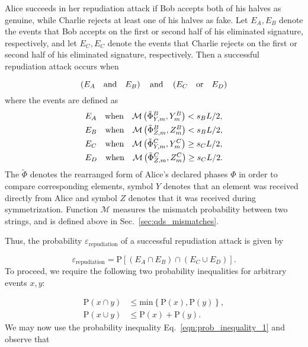 
Alice succeeds in her repudiation attack if Bob accepts both of his halves as genuine, while Charlie rejects at least one of his halves as fake. Let $E_A, E_B$ denote the events that Bob accepts on the first or second half of his eliminated signature, respectively, and let $E_C, E_C$ denote the events that Charlie rejects on the first or second half of his eliminated signature, respectively. Then a successful repudiation attack occurs when

\begin{equation}
\left(E_A \qq{and} E_B \right) \qq{and} \left( E_C \qq{or} E_D\right) \notag
\end{equation}
where the events are defined as
\begin{align}\label{eqn:repudiation_events}
&E_A \qq{when} \mathcal{M}\left(\tilde{\Phi}_{Y, m}^B, Y_m^B\right) < s_B L/2,  \notag \\
%
&E_B \qq{when} \mathcal{M}\left(\tilde{\Phi}_{Z, m}^B, Z_m ^B\right) < s_B L/2, \notag \\
%
&E_C \qq{when} \mathcal{M}\left(\tilde{\Phi}_{Y, m}^C, Y_m^C\right) \ge s_C L/2, \notag \\
%
&E_D \qq{when} \mathcal{M}\left(\tilde{\Phi}_{Z, m}^C, Z_m^C\right) \ge s_C L/2 .
\end{align}
The $\tilde{\Phi}$ denotes the rearranged form of Alice's declared phases $\Phi$ in order to compare corresponding elements, symbol $Y$ denotes that an element was received directly from Alice and symbol $Z$ denotes that it was received during symmetrization. Function $\mathcal{M}$ measures the mismatch probability between two strings, and is defined above in Sec.~\ref{sec:qds_mismatches}.

Thus, the probability $\varepsilon_{\text{repudiation}}$ of a successful repudiation attack is given by

\begin{equation}
\varepsilon_{\text{repudiation}} = \text{P}\left[\left(E_A \cap E_B\right) \cap \left(E_C \cup E_D\right)\right].
\end{equation}
To proceed, we require the following two probability inequalities for arbitrary events $x, y$:

\begin{align}
\label{eqn:prob_inequality_1}
\text{P}\left(x \cap y\right) &\le \text{min}\left\{\text{P}\left(x\right), \text{P}\left(y\right)\right\}, \\
\label{eqn:prob_inequality_2}
\text{P}\left(x \cup y\right) &\le \text{P}\left(x\right) + \text{P}\left(y\right).
\end{align}
\noindent We may now use the probability inequality Eq.~\ref{eqn:prob_inequality_1} and observe that 


